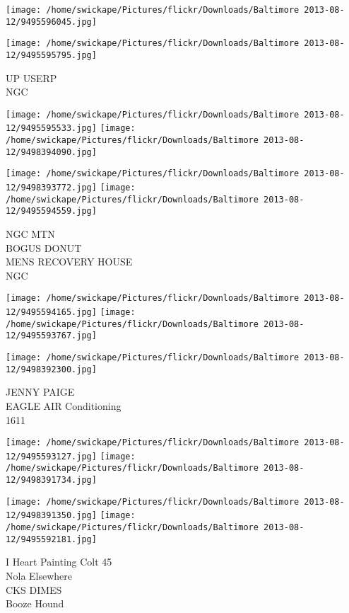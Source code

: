 \documentclass[10pt,letterpaper]{article}
\begin{document}
\texttt{[image: /home/swickape/Pictures/flickr/Downloads/Baltimore 2013-08-12/9495596045.jpg]}

\vspace{0.25in}
\texttt{[image: /home/swickape/Pictures/flickr/Downloads/Baltimore 2013-08-12/9495595795.jpg]}

UP USERP\\
NGC\\
\pagebreak

\texttt{[image: /home/swickape/Pictures/flickr/Downloads/Baltimore 2013-08-12/9495595533.jpg]}
\texttt{[image: /home/swickape/Pictures/flickr/Downloads/Baltimore 2013-08-12/9498394090.jpg]}

\texttt{[image: /home/swickape/Pictures/flickr/Downloads/Baltimore 2013-08-12/9498393772.jpg]}
\texttt{[image: /home/swickape/Pictures/flickr/Downloads/Baltimore 2013-08-12/9495594559.jpg]}

NGC MTN\\
BOGUS DONUT\\
MENS RECOVERY HOUSE\\
NGC\\
\pagebreak

\texttt{[image: /home/swickape/Pictures/flickr/Downloads/Baltimore 2013-08-12/9495594165.jpg]}
\texttt{[image: /home/swickape/Pictures/flickr/Downloads/Baltimore 2013-08-12/9495593767.jpg]}

\vspace{0.25in}
\texttt{[image: /home/swickape/Pictures/flickr/Downloads/Baltimore 2013-08-12/9498392300.jpg]}

JENNY PAIGE\\
EAGLE AIR Conditioning\\
1611\\
\pagebreak

\texttt{[image: /home/swickape/Pictures/flickr/Downloads/Baltimore 2013-08-12/9495593127.jpg]}
\texttt{[image: /home/swickape/Pictures/flickr/Downloads/Baltimore 2013-08-12/9498391734.jpg]}

\texttt{[image: /home/swickape/Pictures/flickr/Downloads/Baltimore 2013-08-12/9498391350.jpg]}
\texttt{[image: /home/swickape/Pictures/flickr/Downloads/Baltimore 2013-08-12/9495592181.jpg]}

I Heart Painting Colt 45\\
Nola Elsewhere\\
CKS DIMES\\
Booze Hound\\
\pagebreak
\end{document}
